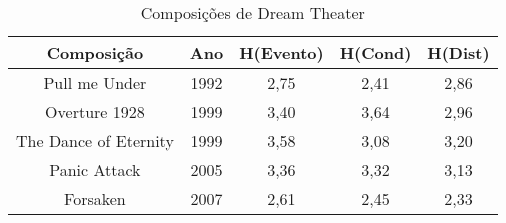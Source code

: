 \begin{table}[]
\centering
\caption{Composições de Dream Theater}
\begin{tabular}{|c|c|c|c|c|}
\hline
\rowcolor[HTML]{9B9B9B} 
{\color[HTML]{FFFFFF} Composição} & {\color[HTML]{FFFFFF} Ano} & {\color[HTML]{FFFFFF} H(Evento)} & {\color[HTML]{FFFFFF} H(Cond)} & {\color[HTML]{FFFFFF} H(Dist)} \\ \hline
Pull me Under                     & 1992                       & 2,75                             & 2,41                           & 2,86                           \\ \hline
Overture 1928                     & 1999                       & 3,40                             & 3,64                           & 2,96                           \\ \hline
The Dance of Eternity             & 1999                       & 3,58                             & 3,08                           & 3,20                           \\ \hline
Panic Attack                      & 2005                       & 3,36                             & 3,32                           & 3,13                           \\ \hline
Forsaken                          & 2007                       & 2,61                             & 2,45                           & 2,33                           \\ \hline
\end{tabular}
\end{table}

